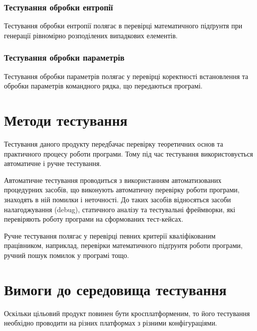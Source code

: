 \documentclass[a4paper,oneside,DIV=12,12pt]{scrartcl}
\begin{document}
			\subsubsection{Тестування обробки ентропії}
				Тестування обробки ентропії полягає в перевірці математичного підґрунтя при генерації рівномірно розподілених випадкових елементів.
				
			\subsubsection{Тестування обробки параметрів}
				Тестування обробки параметрів полягає у перевірці коректності встановлення та обробки параметрів командного рядка, що передаються програмі.
				
    \section{Методи тестування}
		Тестування даного продукту передбачає перевірку теоретичних основ та практичного процесу роботи програми. Тому під час тестування використовується автоматичне і ручне тестування.
		
		Автоматичне тестування проводиться з використанням автоматизованих процедурних засобів, що виконують автоматичну перевірку роботи програми, знаходять в ній помилки і неточності. До таких засобів відносяться засоби налагоджування (debug), статичного аналізу та тестувальні фреймворки, які перевіряють роботу програми на сформованих тест-кейсах.
		
		Ручне тестування полягає у перевірці певних критерії кваліфікованим працівником, наприклад, перевірки математичного підґрунтя роботи програми, ручний пошук помилок у програмі тощо.
		
    \section{Вимоги до середовища тестування}
		\label{sec:testenvreq}
		Оскільки цільовий продукт повинен бути кросплатформеним, то його тестування необхідно проводити на різних платформах з різними конфігураціями.
		
\end{document}
